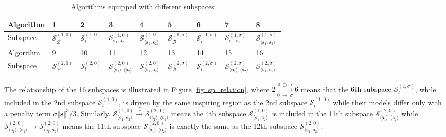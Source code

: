 \documentclass[colorlinks=true, linkcolor=blue, citecolor=blue, urlcolor=blue]{article}
\theoremstyle{plain}
\theoremstyle{definition}
\theoremstyle{remark}
\begin{document}
\begin{table}[htbp!]
    \caption{Algorithms equipped with different subspaces}
    \centering
    \begin{tabular}{m{1.2cm}<{\centering}m{1.2cm}
    <{\centering}m{1.2cm}
    <{\centering}m{1.2cm}<{\centering}m{1.2cm}
    <{\centering}m{1.2cm}
    <{\centering}m{1.2cm}
    <{\centering}m{1.2cm}<{\centering}m{1.2cm}<{\centering}}
    \toprule
     Algorithm & 1 & 2 & 3 & 4 & 5 & 6 & 7 & 8 \\
    \midrule
     Subspace  & $\mathcal{S}_{\mathcal{B}}^{(1,0)}$ & $\mathcal{S}_{l}^{(1,0)}$ & $\mathcal{S}_{\bm s_1,\bm s_2}^{(1,0)}$ & $\mathcal{S}_{\langle \bm s_1,\bm s_2\rangle}^{(1,0)}$ &$\mathcal{S}_{\mathcal{B}}^{(1,\sigma)}$ & $\mathcal{S}_{l}^{(1,\sigma)}$ & $\mathcal{S}_{\bm s_1,\bm s_2}^{(1,\sigma)}$ & $\mathcal{S}_{\langle \bm s_1,\bm s_2\rangle}^{(1,\sigma)}$\\
     \midrule
     \midrule
      Algorithm & 9 & 10 & 11 & 12 & 13 & 14 & 15 & 16 \\
    \midrule
      Subspace  & $\mathcal{S}_{\mathcal{B}}^{(2,0)}$ & $\mathcal{S}_{l}^{(2,0)}$ & $\mathcal{S}_{\langle\bm s_1\rangle,\langle\bm s_2\rangle}^{(2,0)}$ & $\mathcal{S}_{\langle \bm s_1,\bm s_2\rangle}^{(2,0)}$ &$\mathcal{S}_{\mathcal{B}}^{(2,\sigma)}$ & $\mathcal{S}_{l}^{(2,\sigma)}$ & $\mathcal{S}_{\langle\bm s_1\rangle,\langle\bm s_2\rangle}^{(2,\sigma)}$ & $\mathcal{S}_{\langle \bm s_1,\bm s_2\rangle}^{(2,\sigma)}$\\
    \bottomrule
    \end{tabular}
    
    \label{tab:algo 1-8}
\end{table}
The relationship of the 16 subspaces is illustrated in Figure \ref{fig: sp_relation}, where $2\xrightarrow[0\ \to\ \sigma]{0\ \supset\  \sigma}6$ means that the \textcolor{black}{6th subspace $\mathcal{S}_l^{(1,\sigma)}$}, while included in the 2nd subspace $\mathcal{S}_l^{(1,0)}$, is driven by the same inspiring region as the 2nd subspace $\mathcal{S}_l^{(1,0)}$ while their models differ only with a penalty term $\sigma \Vert \bm s\Vert ^3/3$. 
Similarly, $\mathcal{S}_{\langle\bm s_1,\bm s_2\rangle}^{(1,0)}\xrightarrow{\subset}\mathcal{S}_{\langle\bm s_1\rangle,\langle\bm s_2\rangle}^{(2,0)}$ means the 4th subspace $\mathcal{S}_{\langle\bm s_1,\bm s_2\rangle}^{(1,0)}$ is included in the 11th subspace $\mathcal{S}_{\langle\bm s_1\rangle,\langle\bm s_2\rangle}^{(2,0)}$ while $\mathcal{S}_{\langle\bm s_1\rangle,\langle\bm s_2\rangle}^{(2,0)}\xrightarrow{=}\mathcal{S}_{\langle\bm s_1,\bm s_2\rangle}^{(2,0)}$ means the 11th subspace $\mathcal{S}_{\langle\bm s_1\rangle,\langle\bm s_2\rangle}^{(2,0)}$ is exactly the same as the 12th subspace $\mathcal{S}_{\langle\bm s_1,\bm s_2\rangle}^{(2,0)}$.
\end{document}
